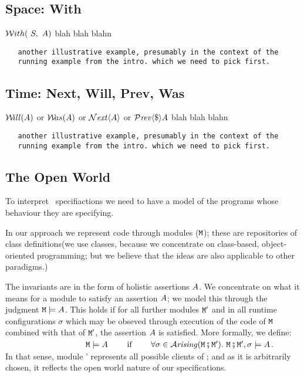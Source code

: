 \subsection{Space: With}

${\mathcal W}ith(\ S,\ A)$ blah blah blahn

\begin{lstlisting}
   another illustrative example, presumably in the context of the
   running example from the intro. which we need to pick first.
\end{lstlisting}


\subsection{Time: Next, Will, Prev, Was}

${{\mathcal W}\!ill}(A)$ or ${{\mathcal W}\!as}(A)$ or ${\mathcal{N}}\textrm{\textit{ext}}\langle A\rangle$ or ${\mathcal{P}}\textrm{\textit{rev}}\langle \$\rangle A$
blah blah blahn

\begin{lstlisting}
   another illustrative example, presumably in the context of the
   running example from the intro. which we need to pick first.
\end{lstlisting}

\subsection{The Open World}

To interpret \Chainmail\ specifiactions we need to have a model of the
programs whose behaviour they are specifying.


In our approach we represent code through modules (${\mbox{\tt{\ensuremath{{\mbox{\tt{M}}}}}}}$); these are
repositories of class definitions(we use classes, because we concentrate on class-based, object-oriented programming; but we believe that the ideas are also applicable to other paradigms.)




  
The invariants are in the form of holistic assertions $A$. We concentrate on what it means for a module to satisfy an assertion $A$; we model this through the judgment ${\mbox{\tt{\ensuremath{{\mbox{\tt{M}}}}}}} \models A$.
This holds if for all further modules ${\mbox{\tt{\ensuremath{{\mbox{\tt{M}}}}}}}'$ and in  all runtime configurations $\sigma$ which may be obseved through execution of the code of ${\mbox{\tt{\ensuremath{{\mbox{\tt{M}}}}}}}$ combined with that of ${\mbox{\tt{\ensuremath{{\mbox{\tt{M}}}}}}}'$, the assertion $A$ is satisfied. More formally, we define:\\
$~ \strut  \hspace{1.3in} \M \models \A \ \ \  \ \ \ \mbox{             if               } \ \ \  \ \ \   \forall \sigma\in\Arising {\M \mkpair  {\M'}}. \ \M \mkpair  {\M'}, \sigma \models \A$.  \\
In that sense, module {\M'}  represents all possible clients of {\M}; and as it is arbitrarily chosen, it reflects the open world nature of our specifications.

